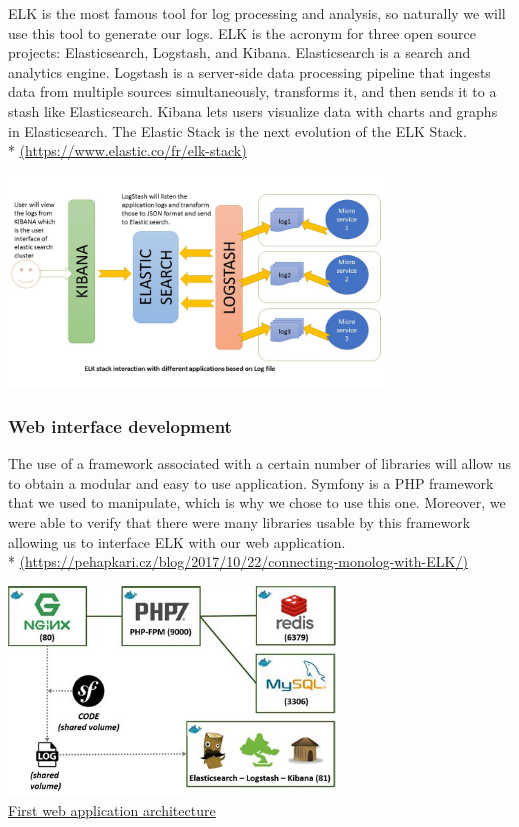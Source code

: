 ELK is the most famous tool for log processing and analysis, so naturally we will use this tool to generate our logs.
ELK is the acronym for three open source projects:
Elasticsearch, Logstash, and Kibana. Elasticsearch is a search and
analytics engine. Logstash is a server‑side data processing pipeline
that ingests data from multiple sources simultaneously, transforms it,
and then sends it to a stash like Elasticsearch. Kibana lets
users visualize data with charts and graphs in Elasticsearch. The
Elastic Stack is the next evolution of the ELK Stack.\\ *
\url{(https://www.elastic.co/fr/elk-stack)}\\
\begin{center}

\includegraphics[width=0.75\textwidth]{images/elk-example.jpg}

\end{center}

\subsubsection{Web interface development}

The use of a framework associated with a certain number of libraries will
allow us to obtain a modular and easy to use application.
Symfony is a PHP framework that we used to manipulate, which is why we chose
to use this one. Moreover, we were able to verify that there were many
libraries usable by this framework allowing us to interface ELK with our web
application. \\ *
\url{(https://pehapkari.cz/blog/2017/10/22/connecting-monolog-with-ELK/)}\\

\begin{center}

\includegraphics[width=0.65\textwidth]{images/symfony-example.jpg}
\\
\underline{First web application architecture}

\end{center}


